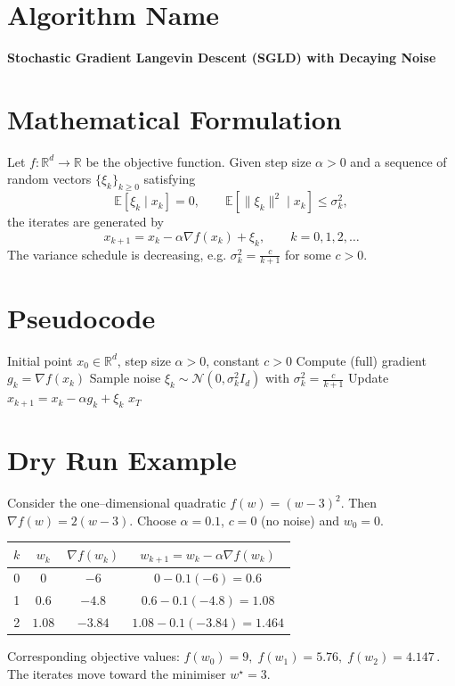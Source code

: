 \documentclass{article}
\newcommand{\E}{\mathbb{E}}
\begin{document}
\section*{Algorithm Name}
\textbf{Stochastic Gradient Langevin Descent (SGLD) with Decaying Noise}

\section*{Mathematical Formulation}
Let $f:\mathbb{R}^d\rightarrow\mathbb{R}$ be the objective function.  
Given step size $\alpha>0$ and a sequence of random vectors $\{\xi_k\}_{k\ge 0}$ satisfying
\[
\E[\xi_k\mid x_k]=0,\qquad \E[\|\xi_k\|^2\mid x_k]\le \sigma_k^2,
\]
the iterates are generated by
\begin{equation}\label{eq:update}
x_{k+1}=x_k-\alpha \nabla f(x_k)+\xi_k,\qquad k=0,1,2,\dots
\end{equation}
The variance schedule is decreasing, e.g. $\sigma_k^2=\frac{c}{k+1}$ for some $c>0$.

\section*{Pseudocode}
\begin{algorithm}[H]
\caption{SGLD with Decaying Noise}
\begin{algorithmic}[1]
\REQUIRE Initial point $x_0\in\mathbb{R}^d$, step size $\alpha>0$, constant $c>0$
    \STATE Compute (full) gradient $g_k=\nabla f(x_k)$
    \STATE Sample noise $\xi_k\sim\mathcal{N}(0,\sigma_k^2 I_d)$ with $\sigma_k^2=\frac{c}{k+1}$
    \STATE Update $x_{k+1}=x_k-\alpha g_k+\xi_k$ \label{alg:update}
\ENDFOR
\RETURN $x_T$
\end{algorithmic}
\end{algorithm}

\section*{Dry Run Example}
Consider the one–dimensional quadratic $f(w)=(w-3)^2$.  
Then $\nabla f(w)=2(w-3)$.  Choose $\alpha=0.1$, $c=0$ (no noise) and $w_0=0$.

\begin{center}
\begin{tabular}{c|c|c|c}
$k$ & $w_k$ & $\nabla f(w_k)$ & $w_{k+1}=w_k-\alpha\nabla f(w_k)$ \\ \hline
0 & $0$ & $-6$ & $0-0.1(-6)=0.6$ \\
1 & $0.6$ & $-4.8$ & $0.6-0.1(-4.8)=1.08$ \\
2 & $1.08$ & $-3.84$ & $1.08-0.1(-3.84)=1.464$ \\
\end{tabular}
\end{center}
Corresponding objective values:
$f(w_0)=9,\; f(w_1)=5.76,\; f(w_2)=4.147\,$.  
The iterates move toward the minimiser $w^\star=3$.
\end{document}
